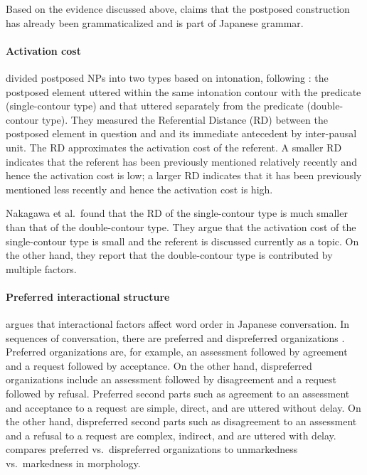 Based on the evidence discussed above,
 claims that the postposed construction has already been grammaticalized and is part of Japanese grammar.


\paragraph{Activation cost}

 divided postposed NPs into two types
based on intonation,
following :
the postposed element uttered within the same intonation contour with the predicate (single-contour type) and
that uttered separately from the predicate (double-contour type).
They measured the Referential Distance (RD) between the postposed element in question and and its immediate antecedent by inter-pausal unit.
The RD approximates the activation cost of the referent.
A smaller RD indicates that the referent has been previously mentioned relatively recently and hence the activation cost is low;
a larger RD indicates that it has been previously mentioned less recently
and hence the activation cost is high.

Nakagawa et al.~found that
the RD of the single-contour type is much smaller than that of the double-contour type.
They argue that the activation cost of the single-contour type is small
and the referent is discussed currently as a topic.
On the other hand, they report that the double-contour type is contributed by multiple factors.


\paragraph{Preferred interactional structure}

 argues that
interactional factors affect word order in Japanese conversation.
In sequences of conversation,
there are preferred and dispreferred organizations \cite{schegloffetal77,heritage84,pomerantz84}.
Preferred organizations are, for example,
an assessment followed by agreement and a request followed by acceptance.
On the other hand,
dispreferred organizations include
an assessment followed by disagreement and a request followed by refusal.
Preferred second parts such as agreement to an assessment and acceptance to a request are simple, direct, and are uttered without delay.
On the other hand,
dispreferred second parts such as disagreement to an assessment and a refusal to a request are complex, indirect, and are uttered with delay.
 compares preferred vs.~dispreferred organizations to unmarkedness vs.~markedness in morphology.

